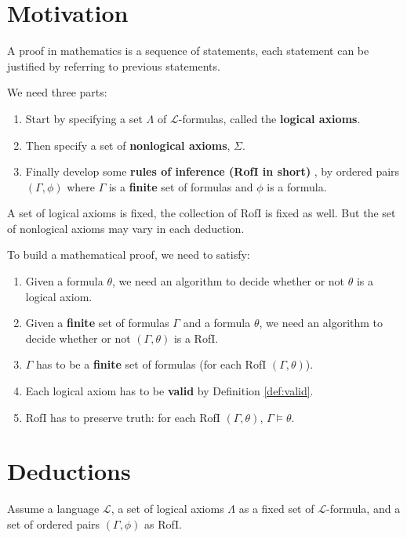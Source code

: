 \documentclass[11pt,letterpaper]{book}
\theoremstyle{definition}
\begin{document}
\section{Motivation}\label{sec:2_1_movitation}


A proof in mathematics is a sequence of statements, each statement can
be justified by referring to previous statements.

We need three parts:

\begin{enumerate}
\item{Start by specifying a set $\Lambda$ of $\mathcal{L}$-formulas,
called the \textbf{logical axioms}.}
\item{Then specify a set of \textbf{nonlogical axioms}, $\Sigma$.}
\item{Finally develop some \textbf{rules of inference (RofI in short) },
by ordered pairs $( \Gamma, \phi )$ where $\Gamma$ is a \textbf{finite}
set of
formulas and $\phi$ is a formula.}
\end{enumerate}

A set of logical axioms is fixed, the collection of RofI is fixed as
well. But the set of nonlogical axioms may vary in each
deduction.


To build a mathematical proof, we need to satisfy:
\begin{enumerate}
\item{Given a formula $\theta$, we need an algorithm to decide whether or
not $\theta$ is a logical axiom.}
\item{Given a \textbf{finite} set of formulas $\Gamma$ and a formula
$\theta$, we need an algorithm to decide whether or not $(\Gamma, \theta)$
is a RofI.}
\item{$\Gamma$ has to be a \textbf{finite} set of formulas (for each
RofI $(\Gamma , \theta)$).}
\item{Each logical axiom has to be \textbf{valid} by Definition
\ref{def:valid}.}
\item{RofI has to preserve truth: for each RofI $(\Gamma, \theta)$,
$\Gamma \models \theta$.}
\end{enumerate}


\section{Deductions}


Assume a language $\mathcal{L}$, a set of logical axioms $\Lambda$ as a
fixed set of $\mathcal{L}$-formula, and a set of ordered pairs $(\Gamma,
\phi)$ as RofI.
\end{document}
